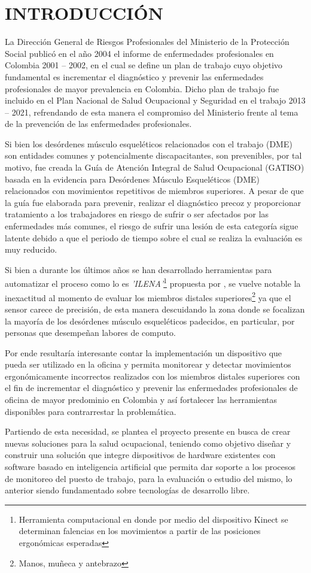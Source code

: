 \newpage
\chapter{INTRODUCCIÓN} 
La Dirección General de Riesgos Profesionales del Ministerio de la Protección Social publicó en el año 2004 el informe de enfermedades profesionales en Colombia 2001 – 2002, en el cual se define un plan de trabajo cuyo objetivo fundamental es incrementar el diagnóstico y prevenir las enfermedades profesionales de mayor prevalencia en Colombia. Dicho plan de trabajo fue incluido en el Plan Nacional de Salud Ocupacional y Seguridad en el trabajo 2013 – 2021, refrendando de esta manera el compromiso del Ministerio frente al tema de la prevención de las enfermedades profesionales.

Si bien los desórdenes músculo esqueléticos relacionados con el trabajo (DME) son entidades comunes y potencialmente discapacitantes, son prevenibles, por tal motivo, fue creada la Guía de Atención Integral de Salud Ocupacional (GATISO) basada en la evidencia para Desórdenes Músculo Esqueléticos (DME) relacionados con movimientos repetitivos de miembros superiores. A pesar de que la guía fue elaborada para prevenir, realizar el diagnóstico precoz y proporcionar tratamiento a los trabajadores en riesgo de sufrir o ser afectados por las enfermedades más comunes, el riesgo de sufrir una lesión de esta categoría sigue latente debido a que el periodo de tiempo sobre el cual se realiza la evaluación es muy reducido.

Si bien a durante los últimos años se han desarrollado herramientas para automatizar el proceso como lo es \textit{'ILENA'}\footnote{Herramienta computacional en donde por medio del dispositivo Kinect se determinan falencias en los movimientos a partir de las posiciones ergonómicas esperadas} propuesta por \parencite{Moya2015ModeloOcupacional}, se vuelve notable la inexactitud al momento de evaluar los miembros distales superiores\footnote{Manos, muñeca y antebrazo} ya que el sensor carece de precisión, de esta manera descuidando la zona donde se focalizan la mayoría de los desórdenes músculo esqueléticos padecidos, en particular, por personas que desempeñan labores de computo.

Por ende resultaría interesante contar la implementación un dispositivo que pueda ser utilizado en la oficina y permita monitorear y detectar movimientos ergonómicamente incorrectos realizados con los miembros distales superiores con el fin de incrementar el diagnóstico y prevenir las enfermedades profesionales de oficina de mayor predominio en Colombia y así fortalecer las herramientas disponibles para contrarrestar la problemática.

Partiendo de esta necesidad, se plantea el proyecto presente en busca de crear nuevas soluciones para la salud ocupacional, teniendo como objetivo diseñar y construir una solución que integre dispositivos de hardware existentes con software basado en inteligencia artificial que permita dar soporte a los procesos de monitoreo del puesto de trabajo, para la evaluación o estudio del mismo, lo anterior siendo fundamentado sobre tecnologías de desarrollo libre.